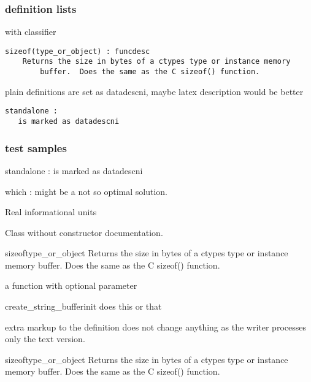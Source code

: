 \subsubsection{definition lists\label{-definition-lists}}

with classifier
\begin{verbatim}
sizeof(type_or_object) : funcdesc
    Returns the size in bytes of a ctypes type or instance memory
        buffer.  Does the same as the C sizeof() function.
\end{verbatim}

plain definitions are set as datadescni, maybe latex description would
be better
\begin{verbatim}
standalone :
   is marked as datadescni
\end{verbatim}


\subsubsection{test samples\label{-test-samples}}

\begin{datadescni}{standalone :}
is marked as datadescni
\end{datadescni}

\begin{datadescni}{which :}
might be a not so optimal solution.
\end{datadescni}

Real informational units

\begin{classdesc*}{Class}
without constructor documentation.
\end{classdesc*}

\begin{funcdesc}{sizeof}{type_or_object}
Returns the size in bytes of a ctypes type or instance memory
buffer.  Does the same as the C sizeof() function.
\end{funcdesc}

a function with optional parameter

\begin{funcdesc}{create_string_buffer}{init}
does this or that
\end{funcdesc}

extra markup to the definition does not change anything as the writer processes
only the text version.

\begin{funcdesc}{sizeof}{type_or_object}
Returns the size in bytes of a ctypes type or instance memory
buffer.  Does the same as the C sizeof() function.
\end{funcdesc}

